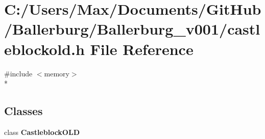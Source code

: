 \section{C\+:/\+Users/\+Max/\+Documents/\+Git\+Hub/\+Ballerburg/\+Ballerburg\+\_\+v001/castleblockold.h File Reference}
\label{castleblockold_8h}
{\ttfamily \#include $<$memory$>$}\\*
\subsection*{Classes}
\begin{DoxyCompactItemize}
\item 
class {\bf Castleblock\+O\+L\+D}
\end{DoxyCompactItemize}
